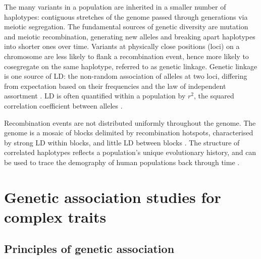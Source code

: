 \begin{outline}
\1 The many variants in a population are inherited in a smaller number of haplotypes: 
contiguous stretches of the genome passed through generations via meiotic segregation.
The fundamental sources of genetic diversity are mutation and meiotic recombination, generating new alleles and breaking apart haplotypes into shorter ones over time.
Variants at physically close positions (loci) on a chromosome are less likely to flank a recombination event, hence more likely to cosegregate on the same haplotype, referred to as genetic linkage.
Genetic linkage is one source of \gls{LD}: the non-random association of alleles at two loci, differing from expectation based on their frequencies and the law of independent assortment \autocite{slatkin2008LinkageDisequilibriumUnderstanding}.
\gls{LD} is often quantified within a population by $r^2$, the squared correlation coefficient between alleles \autocite{slatkin2008LinkageDisequilibriumUnderstanding}.

Recombination events are not distributed uniformly throughout the genome.
The genome is a mosaic of blocks delimited by recombination hotspots, 
characterised by strong \gls{LD} within blocks, and little \gls{LD} between blocks \autocite{wall2003HaplotypeBlocksLinkage,theinternationalhapmapconsortium2007SecondGenerationHuman}.
The structure of correlated haplotypes reflects a population's unique evolutionary history, and can be used to trace the demography of human populations back through time \autocite{karczewski2020AnalyticTranslationalGenetics}.


\section{Genetic association studies for complex traits}

\subsection{Principles of genetic association}


\end{outline}
